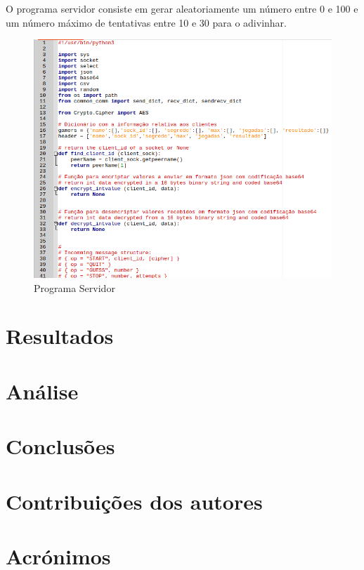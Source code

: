 \documentclass{report}
\begin{document}
O programa servidor consiste em gerar aleatoriamente um número entre 0 e 100 e um número máximo de tentativas entre 10 e 30 para o adivinhar. 
\begin{figure}[h]
	\centering
	\includegraphics[scale=0.58]{server1}	
	\caption{Programa Servidor}
\end{figure}


\chapter{Resultados}
\label{chap.resultados}

\chapter{Análise}
\label{chap.analise}


\chapter{Conclusões}
\label{chap.conclusao}

\chapter*{Contribuições dos autores}


\chapter*{Acrónimos}


\printbibliography
\end{document}
